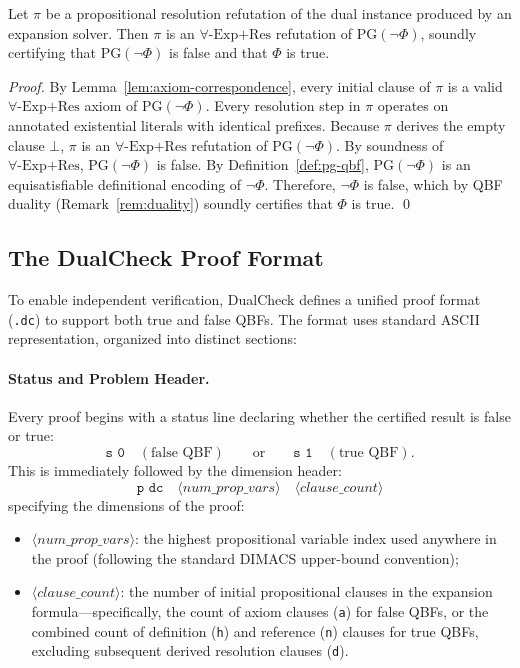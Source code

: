 \documentclass[runningheads]{llncs}
\newcommand{\ExpRes}{\forall\text{-}\mathrm{Exp}\text{+}\mathrm{Res}}
\newcommand{\PG}{\mathrm{PG}}
\begin{document}
\begin{theorem}
    \label{thm:refutation-certification}
    Let $\pi$ be a propositional resolution refutation of the dual instance produced by an expansion solver.
    Then $\pi$ is an $\ExpRes$ refutation of $\PG(\neg\Phi)$, soundly certifying that $\PG(\neg\Phi)$ is false and that $\Phi$ is true.
\end{theorem}

\begin{proof}
    By Lemma~\ref{lem:axiom-correspondence}, every initial clause of $\pi$ is a valid $\ExpRes$ axiom of $\PG(\neg\Phi)$.
    Every resolution step in $\pi$ operates on annotated existential literals with identical prefixes.
    Because $\pi$ derives the empty clause $\bot$, $\pi$ is an $\ExpRes$ refutation of $\PG(\neg\Phi)$.
    By soundness of $\ExpRes$, $\PG(\neg\Phi)$ is false.
    By Definition~\ref{def:pg-qbf}, $\PG(\neg\Phi)$ is an equisatisfiable definitional encoding of $\neg\Phi$.
    Therefore, $\neg\Phi$ is false, which by QBF duality (Remark~\ref{rem:duality}) soundly certifies that $\Phi$ is true.
    \qed
\end{proof}

\subsection{The DualCheck Proof Format}
\label{subsec:format}

To enable independent verification, DualCheck defines a unified proof format (\texttt{.dc}) to support both true and false QBFs.
The format uses standard ASCII representation, organized into distinct sections:

\paragraph*{Status and Problem Header.}
Every proof begins with a status line declaring whether the certified result is false or true:
\begin{equation*}
    \texttt{s 0} \quad (\text{false QBF}) \qquad\text{or}\qquad \texttt{s 1} \quad (\text{true QBF}) .
\end{equation*}
This is immediately followed by the dimension header:
\begin{equation*}
    \texttt{p dc} \quad \langle\mathit{num\_prop\_vars}\rangle \quad \langle\mathit{clause\_count}\rangle
\end{equation*}
specifying the dimensions of the proof:
\begin{itemize}
    \item $\langle\mathit{num\_prop\_vars}\rangle$: the highest propositional variable index used anywhere in the proof (following the standard DIMACS upper-bound convention);
    \item $\langle\mathit{clause\_count}\rangle$: the number of initial propositional clauses in the expansion formula---specifically, the count of axiom clauses (\texttt{a}) for false QBFs, or the combined count of definition (\texttt{h}) and reference (\texttt{n}) clauses for true QBFs, excluding subsequent derived resolution clauses (\texttt{d}).
\end{itemize}
\end{document}
